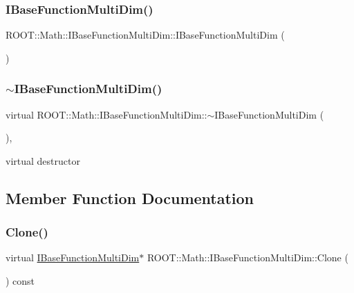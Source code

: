 \subsubsection{\texorpdfstring{IBaseFunctionMultiDim()}{IBaseFunctionMultiDim()}\hspace{0.1cm}{\footnotesize\ttfamily [2/2]}}
{\footnotesize\ttfamily R\+O\+O\+T\+::\+Math\+::\+I\+Base\+Function\+Multi\+Dim\+::\+I\+Base\+Function\+Multi\+Dim (\begin{DoxyParamCaption}{ }\end{DoxyParamCaption})\hspace{0.3cm}{\ttfamily [inline]}}

\mbox{\label{classROOT_1_1Math_1_1IBaseFunctionMultiDim_a5133dc3b08b78281ddf471506810f1c4}} 
\subsubsection{\texorpdfstring{$\sim$IBaseFunctionMultiDim()}{~IBaseFunctionMultiDim()}\hspace{0.1cm}{\footnotesize\ttfamily [2/2]}}
{\footnotesize\ttfamily virtual R\+O\+O\+T\+::\+Math\+::\+I\+Base\+Function\+Multi\+Dim\+::$\sim$\+I\+Base\+Function\+Multi\+Dim (\begin{DoxyParamCaption}{ }\end{DoxyParamCaption})\hspace{0.3cm}{\ttfamily [inline]}, {\ttfamily [virtual]}}

virtual destructor 

\subsection{Member Function Documentation}
\mbox{\label{classROOT_1_1Math_1_1IBaseFunctionMultiDim_a57939204b1f525b43835b42e0635dd3b}} 
\subsubsection{\texorpdfstring{Clone()}{Clone()}\hspace{0.1cm}{\footnotesize\ttfamily [1/2]}}
{\footnotesize\ttfamily virtual \mbox{\hyperlink{classROOT_1_1Math_1_1IBaseFunctionMultiDim}{I\+Base\+Function\+Multi\+Dim}}$\ast$ R\+O\+O\+T\+::\+Math\+::\+I\+Base\+Function\+Multi\+Dim\+::\+Clone (\begin{DoxyParamCaption}{ }\end{DoxyParamCaption}) const\hspace{0.3cm}{\ttfamily [pure virtual]}}

